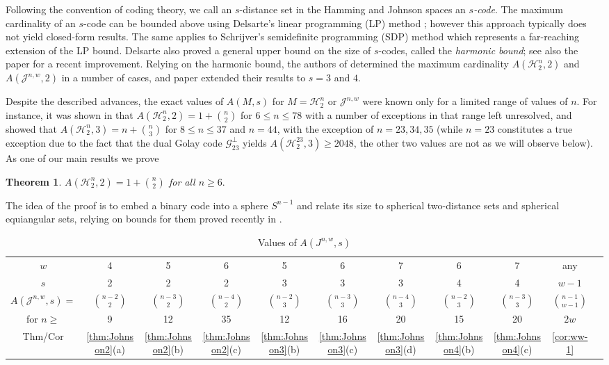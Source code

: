 \documentclass{amsart}
\newtheorem{theoremenv}[definitionenv]{Theorem}
\newenvironment{theorem}{\begin{theoremenv}\rm}{\end{theoremenv}}
\newcommand{\cH}{\mathcal{H}}
\newcommand{\cJ}{\mathcal{J}}
\begin{document}
Following the convention of coding theory, we call an $s$-distance set in the Hamming and Johnson spaces an \textit{$s$-code}. The maximum cardinality of an $s$-code can be bounded above using Delsarte's linear programming (LP) method \cite{D73}; however this approach 
typically does not yield closed-form results. The same applies to Schrijver's semidefinite programming (SDP) method \cite{S05,GMS12} which represents a
far-reaching extension of the LP bound. Delsarte \cite{D73,Del73b} also proved a general upper bound on the size of $s$-codes, called the {\em harmonic bound}; see also the paper \cite{NS10} for a recent improvement. Relying on the harmonic bound, the authors of \cite{BM11} determined the maximum cardinality $A(\cH_{2}^{n}, 2)$ and $A(\cJ^{n, w}, 2)$ in a number of cases, and paper \cite{MN11} extended their results to $s = 3$ and $4$. 

Despite the described advances, the exact values of $A(M,s)$ for $M=\cH_2^n$ or $\cJ^{n,w}$ were known only for a limited range
of values of $n$. For instance, it was shown in \cite{BM11} that $A(\cH_2^n,2)=1+\binom n2$ for $6\le n\le 78$ with a number of
exceptions in that range left unresolved, and \cite{MN11} showed that $A(\cH_2^n,3)= n + \binom{n}{3}$ for $8\le n\le 37$ and $n=44$,
with the exception of $n=23,34,35$ (while $n=23$ constitutes a true exception due to the fact that the dual Golay code ${\mathcal G}_{23}^\bot$ yields $A(\cH_{2}^{23}, 3)\ge 2048$, the other two values are not as we will observe below). As one of our main results we prove
\begin{theorem}\label{thm:Hamming2}
$A(\cH_2^n,2)=1+\binom n2$ for all $n\ge 6.$
\end{theorem}
The idea of the proof is to embed a binary code into a sphere $S^{n-1}$ and relate its size to spherical two-distance sets and
spherical equiangular sets, relying on bounds for them proved recently in \cite{GY18}. 


\begin{table}[t]\label{table:gb}
\caption{{\small Values of $A(J^{n,w},s)$}}
{\small \begin{tabular}{|c|*{10}{|c}|}
\hline
$w$&     4  &5 &6 &5 &6 &7 &6 &7 &any\\[.03in]
$s$ &    2  &2 &2 &3 &3 &3 &4 &4 &$w-1$\\[.03in]
$A(\cJ^{n,w},s)= $ & $\binom{n-2}2$& $\binom{n-3}2$ &$\binom{n-4}2$ &$\binom{n-2}3$ &$\binom{n-3}3$ &$\binom{n-4}3$ &$\binom{n-2}3$ &$\binom{n-3}3$ &$\binom{n-1}{w-1}$ \\[.03in]
for $n\ge$ &9 &12 &35 &12 &16 &{20} &15 &20 &$2w$\\[.04in]
Thm/Cor &\ref{thm:Johnson2}(a) &\ref{thm:Johnson2}(b) &\ref{thm:Johnson2}(c)&\ref{thm:Johnson3}(b)&\ref{thm:Johnson3}(c)&\ref{thm:Johnson3}(d)&\ref{thm:Johnson4}(b)&\ref{thm:Johnson4}(c)&\ref{cor:ww-1}\\
\hline
\end{tabular}}
\end{table}
\end{document}
